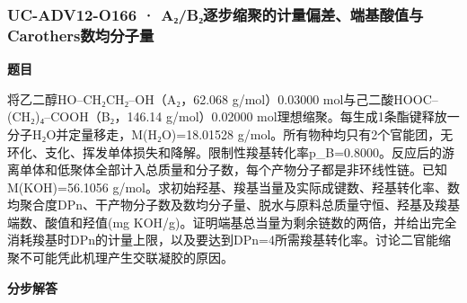 \documentclass[UTF8,11pt,a4paper]{ctexart}
\begin{document}
\subsubsection*{UC-ADV12-O166 · A₂/B₂逐步缩聚的计量偏差、端基酸值与Carothers数均分子量}
\noindent\textbf{题目}\par
将乙二醇HO–CH₂CH₂–OH（A₂，62.068 g/mol）0.03000 mol与己二酸HOOC–(CH₂)₄–COOH（B₂，146.14 g/mol）0.02000 mol理想缩聚。每生成1条酯键释放一分子H₂O并定量移走，M(H₂O)=18.01528 g/mol。所有物种均只有2个官能团，无环化、支化、挥发单体损失和降解。限制性羧基转化率p\_B=0.8000。反应后的游离单体和低聚体全部计入总质量和分子数，每个产物分子都是非环线性链。已知M(KOH)=56.1056 g/mol。求初始羟基、羧基当量及实际成键数、羟基转化率、数均聚合度DPn、干产物分子数及数均分子量、脱水与原料总质量守恒、羟基及羧基端数、酸值和羟值(mg KOH/g)。证明端基总当量为剩余链数的两倍，并给出完全消耗羧基时DPn的计量上限，以及要达到DPn=4所需羧基转化率。讨论二官能缩聚不可能凭此机理产生交联凝胶的原因。\par
\medskip\noindent\textbf{分步解答}
\end{document}
